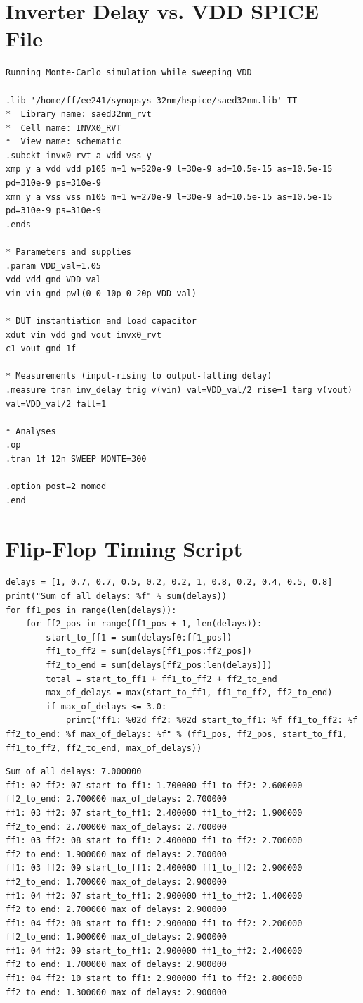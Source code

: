 \documentclass[11pt]{article}
\begin{document}
\section{Inverter Delay vs. VDD SPICE File}
\begin{verbatim}
Running Monte-Carlo simulation while sweeping VDD

.lib '/home/ff/ee241/synopsys-32nm/hspice/saed32nm.lib' TT
*  Library name: saed32nm_rvt
*  Cell name: INVX0_RVT
*  View name: schematic
.subckt invx0_rvt a vdd vss y
xmp y a vdd vdd p105 m=1 w=520e-9 l=30e-9 ad=10.5e-15 as=10.5e-15 pd=310e-9 ps=310e-9
xmn y a vss vss n105 m=1 w=270e-9 l=30e-9 ad=10.5e-15 as=10.5e-15 pd=310e-9 ps=310e-9
.ends 

* Parameters and supplies
.param VDD_val=1.05
vdd vdd gnd VDD_val
vin vin gnd pwl(0 0 10p 0 20p VDD_val)

* DUT instantiation and load capacitor
xdut vin vdd gnd vout invx0_rvt
c1 vout gnd 1f

* Measurements (input-rising to output-falling delay)
.measure tran inv_delay trig v(vin) val=VDD_val/2 rise=1 targ v(vout) val=VDD_val/2 fall=1

* Analyses
.op
.tran 1f 12n SWEEP MONTE=300

.option post=2 nomod
.end
\end{verbatim}

\section{Flip-Flop Timing Script}
\begin{verbatim}
delays = [1, 0.7, 0.7, 0.5, 0.2, 0.2, 1, 0.8, 0.2, 0.4, 0.5, 0.8]
print("Sum of all delays: %f" % sum(delays))
for ff1_pos in range(len(delays)):
	for ff2_pos in range(ff1_pos + 1, len(delays)):
		start_to_ff1 = sum(delays[0:ff1_pos])
		ff1_to_ff2 = sum(delays[ff1_pos:ff2_pos])
		ff2_to_end = sum(delays[ff2_pos:len(delays)])
		total = start_to_ff1 + ff1_to_ff2 + ff2_to_end
		max_of_delays = max(start_to_ff1, ff1_to_ff2, ff2_to_end)
		if max_of_delays <= 3.0:
			print("ff1: %02d ff2: %02d start_to_ff1: %f ff1_to_ff2: %f ff2_to_end: %f max_of_delays: %f" % (ff1_pos, ff2_pos, start_to_ff1, ff1_to_ff2, ff2_to_end, max_of_delays))
\end{verbatim}
\begin{verbatim}
Sum of all delays: 7.000000
ff1: 02 ff2: 07 start_to_ff1: 1.700000 ff1_to_ff2: 2.600000 ff2_to_end: 2.700000 max_of_delays: 2.700000
ff1: 03 ff2: 07 start_to_ff1: 2.400000 ff1_to_ff2: 1.900000 ff2_to_end: 2.700000 max_of_delays: 2.700000
ff1: 03 ff2: 08 start_to_ff1: 2.400000 ff1_to_ff2: 2.700000 ff2_to_end: 1.900000 max_of_delays: 2.700000
ff1: 03 ff2: 09 start_to_ff1: 2.400000 ff1_to_ff2: 2.900000 ff2_to_end: 1.700000 max_of_delays: 2.900000
ff1: 04 ff2: 07 start_to_ff1: 2.900000 ff1_to_ff2: 1.400000 ff2_to_end: 2.700000 max_of_delays: 2.900000
ff1: 04 ff2: 08 start_to_ff1: 2.900000 ff1_to_ff2: 2.200000 ff2_to_end: 1.900000 max_of_delays: 2.900000
ff1: 04 ff2: 09 start_to_ff1: 2.900000 ff1_to_ff2: 2.400000 ff2_to_end: 1.700000 max_of_delays: 2.900000
ff1: 04 ff2: 10 start_to_ff1: 2.900000 ff1_to_ff2: 2.800000 ff2_to_end: 1.300000 max_of_delays: 2.900000
\end{verbatim}
\end{document}
